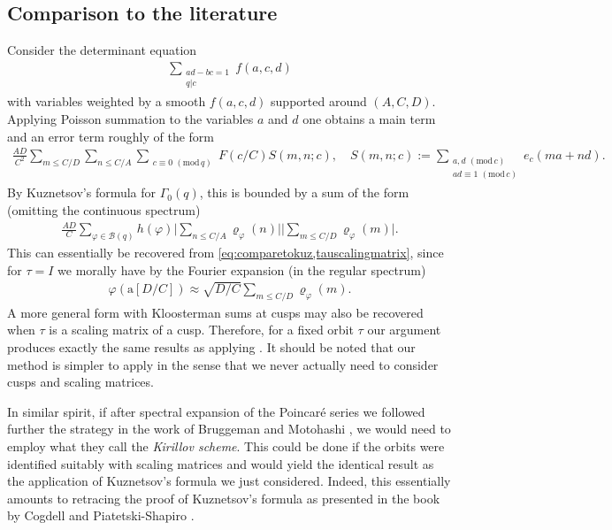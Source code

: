 \documentclass[12pt]{amsart}
\theoremstyle{definition}
\theoremstyle{remark}
\numberwithin{equation}{section}
\newcommand{\B}{\mathcal{B}}
\newcommand{\1}{{\mathbf 1}}
\renewcommand{\a}{\mathrm{a}}
\renewcommand{\pmod}[1]{\,\,(\mathrm{mod}\,{#1})}
\begin{document}
\subsection{Comparison to the literature}
Consider the determinant equation 
\begin{align*}
    \sum_{\substack{ad-bc = 1 \\ q |c}} f(a,c,d)
\end{align*}
with variables weighted by a smooth $f(a,c,d)$ supported around $(A,C,D)$. Applying Poisson summation to the variables $a$ and $d$ one obtains a main term and an error term roughly of the form
\begin{align*}
   \frac{AD}{C^2} \sum_{m \leq C/D} \sum_{n \leq C/A} \sum_{\substack{c \equiv 0 \pmod{q}}} F(c/C) S(m,n;c), \quad S(m,n;c) := \sum_{\substack{a,d \pmod{c} \\ad \equiv 1\pmod{c}}}e_c(ma+nd).
\end{align*}
By Kuznetsov's formula for $\Gamma_0(q)$, this is bounded by  a sum of the form (omitting the continuous spectrum) 
\begin{align*}
  \frac{AD}{C}   \sum_{\varphi \in \B(q)} h(\varphi)  \bigg| \sum_{n \leq C/A} \varrho_\varphi(n) \bigg| \bigg| \sum_{m \leq C/D} \varrho_\varphi(m) \bigg|. 
\end{align*}
This can essentially be recovered from \eqref{eq:comparetokuz,tauscalingmatrix}, since for $\tau = I$ we morally have by the Fourier expansion (in the regular spectrum)
\begin{align*}
    \varphi( \a [D/C])  \approx \sqrt{D/C} \sum_{m \leq C/D}  \varrho_\varphi(m).
\end{align*}
A more general form with Kloosterman sums at cusps may also be recovered when $\tau$ is a scaling matrix of a cusp. Therefore, for a fixed orbit $\tau$ our argument produces exactly the same results as applying \cite{deshoullieriwaniec}. It should be noted that our method is simpler to apply in the sense that we never actually need to consider cusps and scaling matrices.

In similar spirit, if after spectral expansion of the Poincar\'e series we followed further the strategy in the work of Bruggeman and Motohashi \cite{BM}, we would need to employ what they call the \emph{Kirillov scheme}. This could be done if the orbits were identified suitably with scaling matrices and would yield the identical result as the application of Kuznetsov's formula we just considered. Indeed, this essentially amounts to retracing the proof of Kuznetsov's formula as presented in the book by Cogdell and Piatetski-Shapiro \cite{CoPi}.
\end{document}
